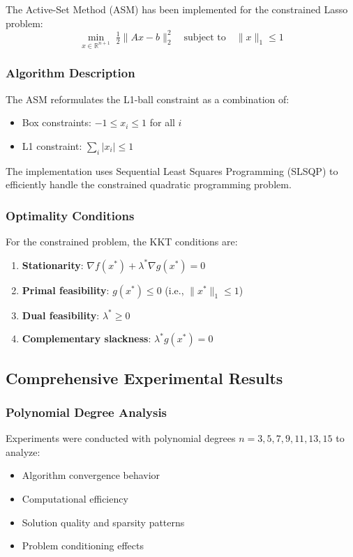 \documentclass[11pt,a4paper]{article}
\begin{document}
The Active-Set Method (ASM) has been implemented for the constrained Lasso problem:
\begin{equation}
    \min_{x \in \mathbb{R}^{n+1}} \; \tfrac{1}{2}\|Ax - b\|_2^2 \quad \text{subject to} \quad \|x\|_1 \leq 1
\end{equation}

\subsubsection{Algorithm Description}

The ASM reformulates the L1-ball constraint as a combination of:
\begin{itemize}
    \item Box constraints: $-1 \leq x_i \leq 1$ for all $i$
    \item L1 constraint: $\sum_i |x_i| \leq 1$
\end{itemize}

The implementation uses Sequential Least Squares Programming (SLSQP) to efficiently handle the constrained quadratic programming problem.

\subsubsection{Optimality Conditions}

For the constrained problem, the KKT conditions are:
\begin{enumerate}
    \item \textbf{Stationarity}: $\nabla f(x^*) + \lambda^* \nabla g(x^*) = 0$
    \item \textbf{Primal feasibility}: $g(x^*) \leq 0$ (i.e., $\|x^*\|_1 \leq 1$)
    \item \textbf{Dual feasibility}: $\lambda^* \geq 0$
    \item \textbf{Complementary slackness}: $\lambda^* g(x^*) = 0$
\end{enumerate}

\subsection{Comprehensive Experimental Results}

\subsubsection{Polynomial Degree Analysis}

Experiments were conducted with polynomial degrees $n = 3, 5, 7, 9, 11, 13, 15$ to analyze:
\begin{itemize}
    \item Algorithm convergence behavior
    \item Computational efficiency
    \item Solution quality and sparsity patterns
    \item Problem conditioning effects
\end{itemize}
\end{document}
